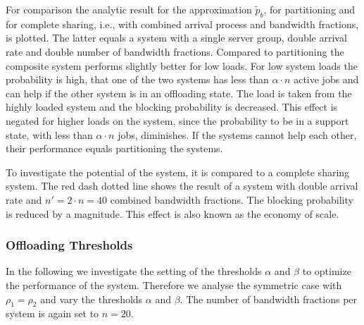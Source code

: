 For comparison the analytic result for the approximation $\tilde{p}_b$, for partitioning and for complete sharing, i.e., with combined arrival process and bandwidth fractions, is plotted.
The latter equals a system with a single server group, double arrival rate and double number of bandwidth fractions.
Compared to partitioning the composite system performs slightly better for low loads.
For low system loads the probability is high, that one of the two systems has less than $\alpha\cdot n$ active jobs and can help if the other system is in an offloading state.
The load is taken from the highly loaded system and the blocking probability is decreased.
This effect is negated for higher loads on the system, since the probability to be in a support state, with less than $\alpha\cdot n$ jobs, diminishes.
If the systems cannot help each other, their performance equals partitioning the systems.

To investigate the potential of the system, it is compared to a complete sharing system.
The red dash dotted line shows the result of a system with double arrival rate and $n'=2\cdot n=40$ combined bandwidth fractions. The blocking probability is reduced by a magnitude. This effect is also known as the economy of scale.


\subsubsection*{Offloading Thresholds}

In the following we investigate the setting of the thresholds $\alpha$ and $\beta$ to optimize the performance of the system.
Therefore we analyse the symmetric case with $\rho_1=\rho_2$ and vary the thresholds $\alpha$ and $\beta$. The number of bandwidth fractions per system is again set to $n=20$.

